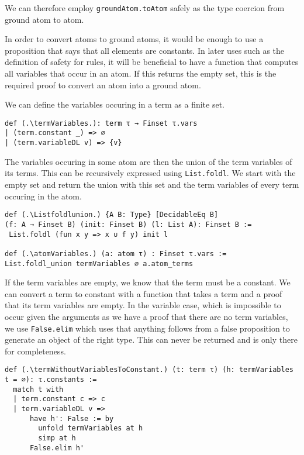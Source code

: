 We can therefore employ \lstinline|groundAtom.toAtom| safely as the type coercion from ground atom to atom.

In order to convert atoms to ground atoms, it would be enough to use a proposition that says that all elements are constants. In later uses such as the definition of safety for rules, it will be beneficial to have a function that computes all variables that occur in an atom. If this returns the empty set, this is the required proof to convert an atom into a ground atom. 

We can define the variables occuring in a term as a finite set.

\begin{lstlisting}
def (.\termVariables.): term τ → Finset τ.vars
| (term.constant _) => ∅
| (term.variableDL v) => {v}
\end{lstlisting}

The variables occuring in some atom are then the union of the term variables of its terms. This can be recursively expressed using \lstinline|List.foldl|. We start with the empty set and return the union with this set and the term variables of every term occuring in the atom.

\begin{lstlisting}
def (.\Listfoldlunion.) {A B: Type} [DecidableEq B]  
(f: A → Finset B) (init: Finset B) (l: List A): Finset B :=
 List.foldl (fun x y => x ∪ f y) init l

def (.\atomVariables.) (a: atom τ) : Finset τ.vars := 
List.foldl_union termVariables ∅ a.atom_terms
\end{lstlisting}

If the term variables are empty, we know that the term must be a constant. We can convert a term to constant with a function that takes a term and a proof that its term variables are empty. In the variable case, which is impossible to occur given the arguments as we have a proof that there are no term variables, we use \lstinline|False.elim| which uses that anything follows from a false proposition to generate an object of the right type. This can never be returned and is only there for completeness.

\begin{lstlisting}
def (.\termWithoutVariablesToConstant.) (t: term τ) (h: termVariables t = ∅): τ.constants :=
  match t with
  | term.constant c => c
  | term.variableDL v =>
      have h': False := by
        unfold termVariables at h
        simp at h
      False.elim h'
\end{lstlisting}

